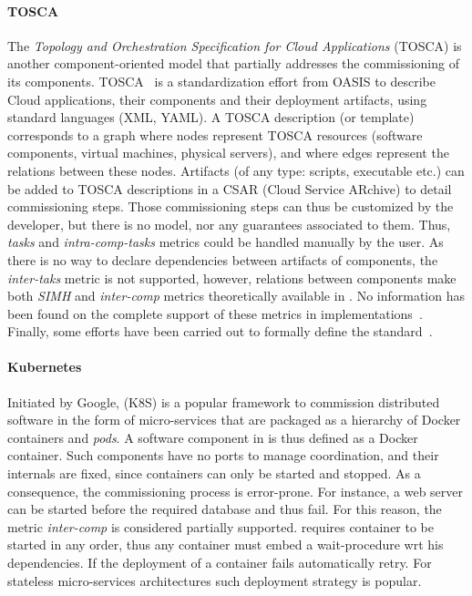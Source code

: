 \paragraph{TOSCA}
The \emph{Topology and Orchestration Specification for Cloud Applications} (TOSCA) is another component-oriented model that partially addresses the commissioning of its components. TOSCA~\cite{tosca:web,brogi2018} is a standardization effort from OASIS to describe Cloud applications, their components and their deployment artifacts, using standard languages (\ie XML, YAML). A TOSCA description (or template) corresponds to a graph where nodes represent TOSCA resources (\eg software components, virtual machines, physical servers), and where edges represent the relations between these nodes. Artifacts (of any type: scripts, executable etc.) can be added to TOSCA descriptions in a CSAR (Cloud Service ARchive) to detail commissioning steps. Those commissioning steps can thus be customized by the developer, but there is no model, nor any guarantees associated to them. Thus, \emph{tasks} and \emph{intra-comp-tasks} metrics could be handled manually by the user. As there is no way to declare dependencies between artifacts of components, the \emph{inter-taks} metric is not supported, however, relations between components make both \emph{SIMH} and \emph{inter-comp} metrics theoretically available in \tosca. No information has been found on the complete support of these metrics in \tosca implementations~\cite{cloudify:web,opentosca:web}. Finally, some efforts have been carried out to formally define the \tosca standard~\cite{7561358}.

\paragraph{Kubernetes}
Initiated by Google, \kubernetes (K8S) is a popular framework to commission distributed software in the form of micro-services that are packaged as a hierarchy of Docker containers and \emph{pods}. A software component in \kubernetes is thus defined as a Docker container. Such components have no ports to manage coordination, and their internals are fixed, since containers can only be started and stopped. As a consequence, the commissioning process is error-prone. For instance, a web server can be started before the required database and thus fail. For this reason, the metric \emph{inter-comp} is considered partially supported. \kubernetes requires container to be started in any order, thus any container must embed a wait-procedure wrt his dependencies. If the deployment of a container fails \kubernetes automatically retry. For stateless micro-services architectures such deployment strategy is popular.

